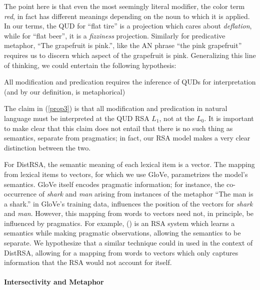 \documentclass[10pt,letterpaper,twocolumn]{article}
\begin{document}
The point here is that even the most seemingly literal modifier, the color term \emph{red}, in fact has different meanings depending on the noun to which it is applied. In our terms, the QUD for ``flat tire'' is a projection which cares about \emph{deflation}, while for ``flat beer'', it is a \emph{fizziness} projection. Similarly for predicative metaphor, ``The grapefruit is pink.'', like the AN phrase ``the pink grapefruit'' requires us to discern which aspect of the grapefruit is pink. Generalizing this line of thinking, we could entertain the following hypothesis:


\begin{exe}
\ex All modification and predication requires the inference of QUDs for interpretation (and by our definition, is metaphorical) \label{prop3}
\end{exe}

The claim in (\ref{prop3}) is that all modification and predication in natural language must be interpreted at the QUD RSA $L_1$, not at the $L_0$. It is important to make clear that this claim does not entail that there is no such thing as semantics, separate from pragmatics; in fact, our RSA model makes a very clear distinction between the two. 

For DistRSA, the semantic meaning of each lexical item is a vector. The mapping from lexical items to vectors, for which we use GloVe, parametrizes the model's semantics. GloVe itself encodes pragmatic information; for instance, the co-occurrence of \emph{shark} and \emph{man} arising from instances of the metaphor ``The man is a shark.'' in GloVe's training data, influences the position of the vectors for \emph{shark} and \emph{man}. However, this mapping from words to vectors need not, in principle, be influenced by pragmatics. For example, (\cite{monroe2015learning}) is an RSA system which learns a semantics while making pragmatic observations, allowing the semantics to be separate. We hypothesize that a similar technique could in used in the context of DistRSA, allowing for a mapping from words to vectors which only captures information that the RSA would not account for itself. 



\paragraph{Intersectivity and Metaphor} 
\end{document}
